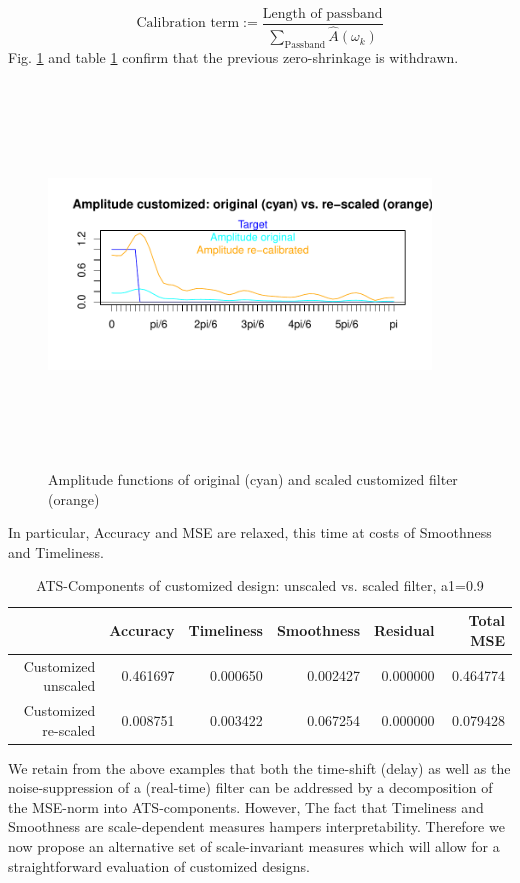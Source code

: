 \documentclass[a4paper]{book}
\begin{document}
\[
\textrm{Calibration~term}:=\frac{\textrm{Length~of~passband}}{\sum_{\textrm{Passband}}\hat{A}(\omega_k)}
\]
Fig. \ref{z_box_plot_amp_and_shift_cust_ST_1_scaled_unscaled} and table \ref{ats_comp_dfa_ST_1_scaled_unscaled} confirm that the previous zero-shrinkage is withdrawn.
\begin{figure}[H]\begin{center}\includegraphics[height=4in, width=4in]{z_box_plot_amp_and_shift_cust_ST_1_scaled_unscaled}\caption{Amplitude functions of original (cyan) and scaled customized filter (orange)\label{z_box_plot_amp_and_shift_cust_ST_1_scaled_unscaled}}\end{center}\end{figure}In particular, Accuracy and MSE are relaxed, this time at costs of Smoothness and Timeliness.  
\begin{table}[ht]
\centering
\begin{tabular}{rrrrrr}
  \hline
 & Accuracy & Timeliness & Smoothness & Residual & Total MSE \\ 
  \hline
Customized unscaled & 0.461697 & 0.000650 & 0.002427 & 0.000000 & 0.464774 \\ 
  Customized re-scaled & 0.008751 & 0.003422 & 0.067254 & 0.000000 & 0.079428 \\ 
   \hline
\end{tabular}
\caption{ATS-Components of customized design: unscaled vs. scaled filter, a1=0.9} 
\label{ats_comp_dfa_ST_1_scaled_unscaled}
\end{table}We retain from the above examples that both the time-shift (delay) as well as the noise-suppression of a (real-time) filter can be addressed by a decomposition of the MSE-norm into ATS-components. However, The fact that Timeliness and Smoothness are scale-dependent measures hampers interpretability. Therefore we now propose an alternative set of scale-invariant measures which will allow for a straightforward evaluation of customized designs. 
\end{document}
